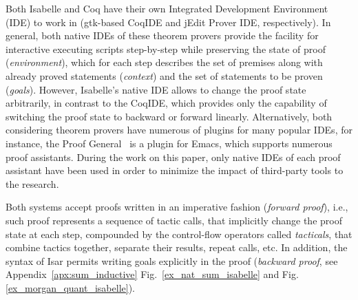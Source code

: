 \documentclass[article]{aaltoseries}
\begin{document}
Both Isabelle and Coq have their own Integrated Development Environment (IDE) to work in (gtk-based CoqIDE and jEdit Prover IDE, respectively). In general, both native IDEs of these theorem provers provide the facility for interactive executing scripts step-by-step while preserving the state of proof (\textit{environment}), which for each step describes the set of premises along with already proved statements (\textit{context}) and the set of statements to be proven (\textit{goals}). However, Isabelle's native IDE allows to change the proof state arbitrarily, in contrast to the CoqIDE, which provides only the capability of switching the proof state to backward or forward linearly. Alternatively, both considering theorem provers have numerous of plugins for many popular IDEs, for instance, the Proof General~\cite{tool_PG} is a plugin for Emacs, which supports numerous proof assistants. During the work on this paper, only native IDEs of each proof assistant have been used in order to minimize the impact of third-party tools to the research.

Both systems accept proofs written in an imperative fashion (\textit{forward proof}), i.e., such proof represents a sequence of tactic calls, that implicitly change the proof state at each step, compounded by the control-flow operators called \textit{tacticals}, that combine tactics together, separate their results, repeat calls, etc. In addition, the syntax of Isar permits writing goals explicitly in the proof (\textit{backward proof}, see Appendix~\ref{apx:sum_inductive} Fig.~\ref{ex_nat_sum_isabelle} and Fig.\ref{ex_morgan_quant_isabelle}).

\end{document}
